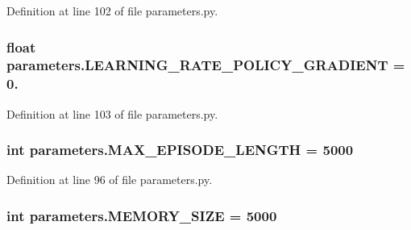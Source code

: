 Definition at line 102 of file parameters.\+py.

\subsubsection[{\texorpdfstring{L\+E\+A\+R\+N\+I\+N\+G\+\_\+\+R\+A\+T\+E\+\_\+\+P\+O\+L\+I\+C\+Y\+\_\+\+G\+R\+A\+D\+I\+E\+NT}{LEARNING_RATE_POLICY_GRADIENT}}]{\setlength{\rightskip}{0pt plus 5cm}float parameters.\+L\+E\+A\+R\+N\+I\+N\+G\+\_\+\+R\+A\+T\+E\+\_\+\+P\+O\+L\+I\+C\+Y\+\_\+\+G\+R\+A\+D\+I\+E\+NT = 0.}\hypertarget{namespaceparameters_aee9255eaabb90fcbf5ba1451159d8279}{}\label{namespaceparameters_aee9255eaabb90fcbf5ba1451159d8279}


Definition at line 103 of file parameters.\+py.

\subsubsection[{\texorpdfstring{M\+A\+X\+\_\+\+E\+P\+I\+S\+O\+D\+E\+\_\+\+L\+E\+N\+G\+TH}{MAX_EPISODE_LENGTH}}]{\setlength{\rightskip}{0pt plus 5cm}int parameters.\+M\+A\+X\+\_\+\+E\+P\+I\+S\+O\+D\+E\+\_\+\+L\+E\+N\+G\+TH = 5000}\hypertarget{namespaceparameters_aa473cc3b100416af3310c6c5a6d19570}{}\label{namespaceparameters_aa473cc3b100416af3310c6c5a6d19570}


Definition at line 96 of file parameters.\+py.

\subsubsection[{\texorpdfstring{M\+E\+M\+O\+R\+Y\+\_\+\+S\+I\+ZE}{MEMORY_SIZE}}]{\setlength{\rightskip}{0pt plus 5cm}int parameters.\+M\+E\+M\+O\+R\+Y\+\_\+\+S\+I\+ZE = 5000}\hypertarget{namespaceparameters_a49f1ad074b5710a98fc783c5627ddade}{}\label{namespaceparameters_a49f1ad074b5710a98fc783c5627ddade}


